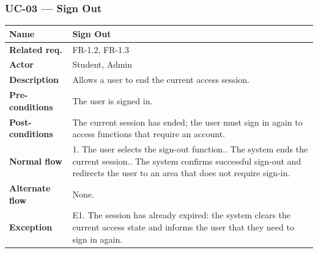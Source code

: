 \subsubsection{UC-03 --- Sign Out}
\begin{longtable}{|p{}|p{}|}
\hline
\textbf{Name} & Sign Out \\
\hline
\textbf{Related req.} & FR-1.2, FR-1.3 \\
\hline
\textbf{Actor} & Student, Admin \\
\hline
\textbf{Description} & Allows a user to end the current access session. \\
\hline
\textbf{Pre-conditions} & The user is signed in. \\
\hline
\textbf{Post-conditions} & The current session has ended; the user must sign in again to access functions that require an account. \\
\hline
\textbf{Normal flow} & 1. The user selects the sign-out function.\newline 2. The system ends the current session.\newline 3. The system confirms successful sign-out and redirects the user to an area that does not require sign-in. \\
\hline
\textbf{Alternate flow} & None. \\
\hline
\textbf{Exception} & E1. The session has already expired: the system clears the current access state and informs the user that they need to sign in again. \\
\hline
\end{longtable}

